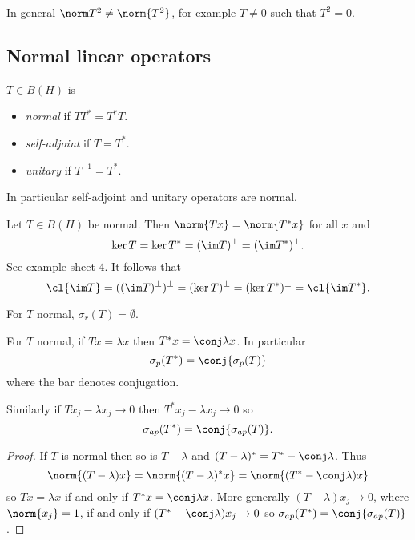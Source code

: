\documentclass[a4paper]{article}
\begin{document}
\begin{note}
  In general \(\norm T^2 \neq \norm{T^2}\), for example \(T \neq 0\) such that \(T^2 = 0\).
\end{note}

\subsection{Normal linear operators}

\begin{definition}
  \(T \in B(H)\) is
  \begin{itemize}
  \item \emph{normal} if \(TT^* = T^*T\).
  \item \emph{self-adjoint} if \(T = T^*\).
  \item \emph{unitary} if \(T^{-1} = T^*\).
  \end{itemize}
\end{definition}

In particular self-adjoint and unitary operators are normal.

\begin{ex}
  Let \(T \in B(H)\) be normal. Then \(\norm{Tx} = \norm{T^*x}\) for all \(x\) and
  \[
    \ker T = \ker T^* = (\im T)^\perp = (\im T^*)^\perp.
  \]
  See example sheet 4. It follows that
  \[
    \cl{\im T} = ((\im T)^\perp)^\perp = (\ker T)^\perp = (\ker T^*)^\perp = \cl{\im T^*}.
  \]
\end{ex}

\begin{corollary}
  For \(T\) normal, \(\sigma_r(T) = \emptyset\).
\end{corollary}

\begin{corollary}
  For \(T\) normal, if \(Tx = \lambda x\) then \(T^*x = \conj \lambda x\). In particular
  \[
    \sigma_p(T^*) = \conj{\sigma_p(T)}
  \]
  where the bar denotes conjugation.

  Similarly if \(Tx_j - \lambda x_j \to 0\) then \(T^* x_j - \lambda x_j \to 0\) so
  \[
    \sigma_{ap}(T^*) = \conj{\sigma_{ap}(T)}.
  \]
\end{corollary}

\begin{proof}
  If \(T\) is normal then so is \(T - \lambda\) and \((T - \lambda)^* = T^* - \conj \lambda\). Thus
  \[
    \norm{(T - \lambda) x} = \norm{(T - \lambda)^* x} = \norm{(T^* - \conj \lambda) x}
  \]
  so \(Tx = \lambda x\) if and only if \(T^*x = \conj \lambda x\). More generally \((T - \lambda)x_j \to 0\), where \(\norm{x_j} = 1\), if and only if \((T^* - \conj \lambda) x_j \to 0\) so \(\sigma_{ap}(T^*) = \conj{\sigma_{ap}(T)}\).
\end{proof}
\end{document}
